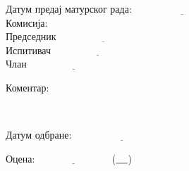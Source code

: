 \documentclass{report}
\theoremstyle{plain}
\theoremstyle{definition}
\begin{document}
\newpage
\noindent Датум предај матурског рада: $\underline{\hspace{4cm}}$\\[1.5cm]
Комисија:\\[2mm]
\hspace*{1cm}Председник\hspace{5mm}$\underline{\hspace{4cm}}$\\[2mm]
\hspace*{1cm}Испитивач\hspace{6.7mm}$\underline{\hspace{4cm}}$\\[2mm]
\hspace*{1cm}Члан\hspace{18.3mm}$\underline{\hspace{4cm}}$\\[1cm]
\begin{minipage}{0.2\linewidth}
\vspace{-7cm}
Коментар:
\end{minipage}
\begin{minipage}{0.8\linewidth}
\vspace{4mm}
\hspace{-1.2cm}
\fbox{
\begin{minipage}{5in}
\hfill\vspace{3in}
\end{minipage}}
\end{minipage}\\[1cm]
\begin{minipage}{0.5\linewidth}
\begin{flushleft}
Датум одбране: $\underline{\hspace{4cm}}$
\end{flushleft}
\end{minipage}
\begin{minipage}{0.5\linewidth}
\begin{flushright}
Оцена: $\underline{\hspace{3cm}}$ ($\underline{\hspace{0.4cm}}$)
\end{flushright}
\end{minipage}
\end{document}
